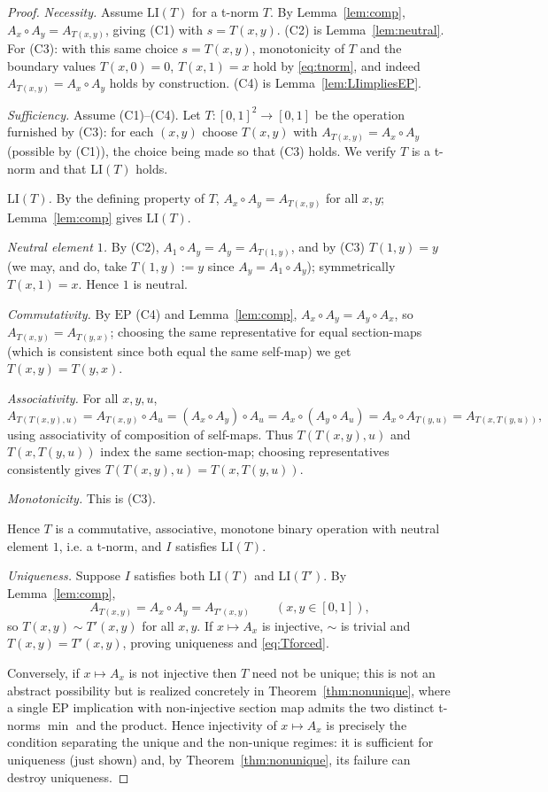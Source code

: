 \documentclass{amsart}
\theoremstyle{definition}
\theoremstyle{remark}
\newcommand{\zo}{[0,1]}
\newcommand{\LI}{\mathrm{LI}}
\newcommand{\EP}{\mathrm{EP}}
\newcommand{\Ax}{A}
\begin{document}
\begin{proof}
\emph{Necessity.} Assume $\LI(T)$ for a t-norm $T$. By Lemma~\ref{lem:comp},
$\Ax_x\circ\Ax_y=\Ax_{T(x,y)}$, giving (C1) with $s=T(x,y)$. (C2) is
Lemma~\ref{lem:neutral}. For (C3): with this same choice $s=T(x,y)$, monotonicity of $T$
and the boundary values $T(x,0)=0$, $T(x,1)=x$ hold by \eqref{eq:tnorm}, and indeed
$\Ax_{T(x,y)}=\Ax_x\circ\Ax_y$ holds by construction. (C4) is Lemma~\ref{lem:LIimpliesEP}.

\emph{Sufficiency.} Assume (C1)--(C4). Let $T\colon\zo^2\to\zo$ be the operation furnished by
(C3): for each $(x,y)$ choose $T(x,y)$ with $\Ax_{T(x,y)}=\Ax_x\circ\Ax_y$ (possible by (C1)),
the choice being made so that (C3) holds. We verify $T$ is a t-norm and that $\LI(T)$ holds.

\textit{$\LI(T)$.} By the defining property of $T$, $\Ax_x\circ\Ax_y=\Ax_{T(x,y)}$ for all
$x,y$; Lemma~\ref{lem:comp} gives $\LI(T)$.

\textit{Neutral element $1$.} By (C2), $\Ax_1\circ\Ax_y=\Ax_y=\Ax_{T(1,y)}$, and by (C3)
$T(1,y)=y$ (we may, and do, take $T(1,y):=y$ since $\Ax_{y}=\Ax_1\circ\Ax_y$); symmetrically
$T(x,1)=x$. Hence $1$ is neutral.

\textit{Commutativity.} By $\EP$ (C4) and Lemma~\ref{lem:comp},
$\Ax_x\circ\Ax_y=\Ax_y\circ\Ax_x$, so $\Ax_{T(x,y)}=\Ax_{T(y,x)}$; choosing the same
representative for equal section-maps (which is consistent since both equal the same
self-map) we get $T(x,y)=T(y,x)$.

\textit{Associativity.} For all $x,y,u$,
\[
\Ax_{T(T(x,y),u)}=\Ax_{T(x,y)}\circ\Ax_u=(\Ax_x\circ\Ax_y)\circ\Ax_u
=\Ax_x\circ(\Ax_y\circ\Ax_u)=\Ax_x\circ\Ax_{T(y,u)}=\Ax_{T(x,T(y,u))},
\]
using associativity of composition of self-maps. Thus $T(T(x,y),u)$ and $T(x,T(y,u))$ index
the same section-map; choosing representatives consistently gives
$T(T(x,y),u)=T(x,T(y,u))$.

\textit{Monotonicity.} This is (C3).

Hence $T$ is a commutative, associative, monotone binary operation with neutral element $1$,
i.e. a t-norm, and $I$ satisfies $\LI(T)$.

\emph{Uniqueness.} Suppose $I$ satisfies both $\LI(T)$ and $\LI(T')$. By
Lemma~\ref{lem:comp},
\[
\Ax_{T(x,y)}=\Ax_x\circ\Ax_y=\Ax_{T'(x,y)}\qquad(x,y\in\zo),
\]
so $T(x,y)\sim T'(x,y)$ for all $x,y$. If $x\mapsto\Ax_x$ is injective, $\sim$ is trivial and
$T(x,y)=T'(x,y)$, proving uniqueness and \eqref{eq:Tforced}.

Conversely, if $x\mapsto\Ax_x$ is not injective then $T$ need not be unique; this is not an
abstract possibility but is realized concretely in Theorem~\ref{thm:nonunique}, where a single
$\EP$ implication with non-injective section map admits the two distinct t-norms $\min$ and the
product. Hence injectivity of $x\mapsto\Ax_x$ is precisely the condition separating the unique
and the non-unique regimes: it is sufficient for uniqueness (just shown) and, by
Theorem~\ref{thm:nonunique}, its failure can destroy uniqueness.
\end{proof}
\end{document}
